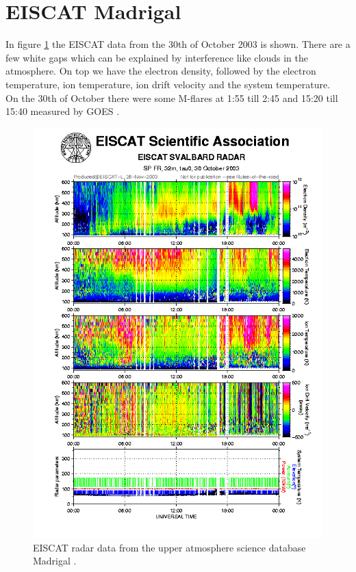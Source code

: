 
\section{EISCAT Madrigal}
In figure \ref{fig:madrigal} the EISCAT data from the 30th of October 2003 is shown. There are a few white gaps which can be explained by interference like clouds in the atmosphere. On top we have the electron density, followed by the electron temperature, ion temperature, ion drift velocity and the system temperature. \\

On the 30th of October there were some M-flares at 1:55 till 2:45 and 15:20 till 15:40 measured by GOES \cite{goes_x-ray_archive}.





\begin{figure}
\centering
\includegraphics[width=.9\textwidth]{figures/2003-10-30_SvalvardPlot.png}
\caption{EISCAT radar data from the upper atmosphere science database Madrigal \cite{madrigal}.}
\label{fig:madrigal}
\end{figure}